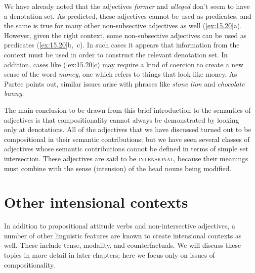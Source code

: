 \ea \label{ex:15.19}
                       \z
\z


We have already noted that the adjectives \textit{former} and \textit{alleged} don’t seem to have a denotation set. As predicted, these adjectives cannot be used as predicates, and the same is true for many other non-subsective adjectives as well (\ref{ex:15.20}a). However, given the right context, some non-subsective adjectives can be used as predicates (\ref{ex:15.20}b,~c). In such cases it appears that information from the context must be used in order to construct the relevant denotation set. In addition, cases like (\ref{ex:15.20}c) may require a kind of coercion to create a new sense of the word \textit{money}, one which refers to things that look like money. As Partee points out, similar issues arise with phrases like \textit{stone lion} and \textit{chocolate bunny}.


\ea \label{ex:15.20}
                       \z
\z


The main conclusion to be drawn from this brief introduction to the semantics of adjectives is that compositionality cannot always be demonstrated by looking only at denotations. All of the adjectives that we have discussed turned out to be compositional in their semantic contributions; but we have seen several classes of adjectives whose semantic contributions cannot be defined in terms of simple set intersection. These adjectives are said to be \textsc{intensional}, because their meanings must combine with the sense (intension) of the head nouns being modified.


\section{Other intensional contexts}\label{sec:15.4}

In addition to propositional attitude verbs and non-intersective adjectives, a number of other linguistic features are known to create intensional contexts as well. These include tense, modality, and counterfactuals. We will discuss these topics in more detail in later chapters; here we focus only on issues of compositionality.


